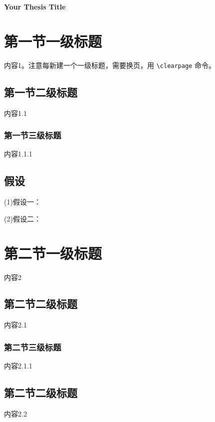 \documentclass[a4paper,AutoFakeBold={2.7},UTF8,zihao=5,twoside]{ctexart} %
\numberwithin{equation}{section}%
\begin{document}
\renewcommand{\abstractname}{\zihao{-2}\bfseries Abstract}

\begin{center}
	\bfseries Your Thesis Title
\end{center}

\vspace{1cm}

\begin{abstract}
	【\textbf{ABSTRACT}】Your Abstract

	\vspace{12pt}

	\noindent【\textbf{KEYWORDS}】Your Keyword 1; Your Keyword 2; Your Keyword 3; Your Keyword 4
\end{abstract}
\clearpage


\section{第一节一级标题}%
内容1。注意每新建一个一级标题，需要换页，用 \verb|\clearpage| 命令。
\subsection{第一节二级标题} \label{第一节二级标题}
内容1.1
\subsubsection{第一节三级标题}
内容1.1.1
\subsection{假设}
(1)假设一：

(2)假设二：

\clearpage

\section{第二节一级标题}
内容2
\subsection{第二节二级标题}
内容2.1
\subsubsection{第二节三级标题}
内容2.1.1
\subsection{第二节二级标题}
内容2.2
\end{document}
